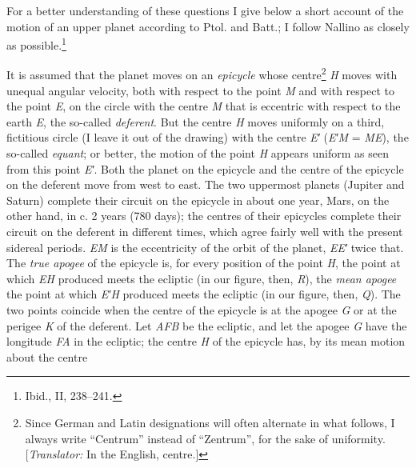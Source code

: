 \documentclass[11pt]{article}
\newcommand{\Pg}[1]{\marginpar{\footnotesize\color{gray}#1}}
\begin{document}
\par For a better understanding of these questions I give below a short account of the motion of an upper planet according to Ptol. and Batt.; I follow Nallino as closely as possible.\footnote{Ibid., II, 238–241.}\par
\par \Pg{48}It is assumed that the planet moves on an \emph{epicycle} whose centre\footnote{Since German and Latin designations will often alternate in what follows, I always write “Centrum” instead of “Zentrum”, for the sake of uniformity. [\emph{Translator:} In the English, centre.]} \emph{H} moves with unequal angular velocity, both with respect to the point \emph{M} and with respect to the point \emph{E}, on the circle with the centre \emph{M} that is eccentric with respect to the earth \emph{E}, the so-called \emph{deferent}. But the centre \emph{H} moves uniformly on a third, fictitious circle (I leave it out of the drawing) with the centre \emph{E′} (\emph{E′M} = \emph{ME}), the so-called \emph{equant}; or better, the motion of the point \emph{H} appears uniform as seen from this point \emph{E′}. Both the planet on the epicycle and the centre of the epicycle on the deferent move from west to east. The two uppermost planets (Jupiter and Saturn) complete their circuit on the epicycle in about one year, Mars, on the other hand, in c. 2 years (780 days); the centres of their epicycles complete their circuit on the deferent in different times, which agree fairly well with the present sidereal periods. \emph{EM} is the eccentricity of the orbit of the planet, \emph{EE′} twice that. The \emph{true apogee} of the epicycle is, for every position of the point \emph{H}, the point at which \emph{EH} produced meets the ecliptic (in our figure, then, \emph{R}), the \emph{mean apogee} the point at which \emph{E′H} produced meets the ecliptic (in our figure, then, \emph{Q}). The two points coincide when the centre of the epicycle is at the apogee \emph{G} or at the perigee \emph{K} of the deferent. Let \emph{AFB} be the ecliptic, and let the apogee \emph{G} have the longitude \emph{FA} in the ecliptic; the centre \emph{H} of the epicycle has, by its mean motion about the centre 
\end{document}
